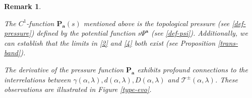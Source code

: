 \documentclass[reqno,11pt,graphicx,]{amsart}
\numberwithin{equation}{section}
\theoremstyle{plain}
\newcommand{\R}{{\mathbb R}}
\newcommand{\p}{\mathbf P}
\newcommand{\3}{\mathbf{3}}
\newcommand{\ma}{\mathbf{a}}
\newtheorem{remark}[theorem]{Remark}
\begin{document}
	\begin{remark}
		\begin{enumerate}
			{\rm 
				\item The $C^1$-function $\p_{\ma}(s)$ mentioned above is the topological pressure (see \eqref{def-pressure}) defined by the potential function $s\Psi^{\ma}$ (see \eqref{def-psi}). Additionally, we can establish that the limits in \eqref{2} and \eqref{4} both exist (see Proposition \ref{trans-band}).
				
				\item The derivative of the pressure function $\p_{\ma}$ exhibits profound connections to the interrelations between $\gamma(\alpha,\lambda), d(\alpha,\lambda), D(\alpha,\lambda) $ and $\mathcal{T}^{\pm}(\alpha,\lambda)$. 
				These observations are illustrated in Figure \ref{type-evo}. 
				
}
\end{enumerate}
\end{remark}
\end{document}
